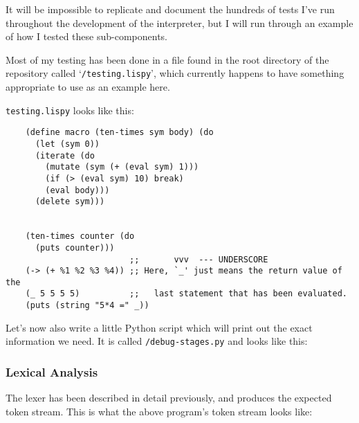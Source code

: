 \documentclass{article}
\newcommand{\code}[1]{\texttt{#1}}
\begin{document}
    It will be impossible to replicate and document the hundreds of tests
    I've run throughout the development of the interpreter, but I will run through
    an example of how I tested these sub-components.

    Most of my testing has been done in a file found in the root directory of
    the repository called `\code{/testing.lispy}', which currently happens
    to have something appropriate to use as an example here.

    \code{testing.lispy} looks like this:

    \begin{verbatim}
    (define macro (ten-times sym body) (do
      (let (sym 0))
      (iterate (do
        (mutate (sym (+ (eval sym) 1)))
        (if (> (eval sym) 10) break)
        (eval body)))
      (delete sym)))


    (ten-times counter (do
      (puts counter)))
                         ;;       vvv  --- UNDERSCORE
    (-> (+ %1 %2 %3 %4)) ;; Here, `_' just means the return value of the
    (_ 5 5 5 5)          ;;   last statement that has been evaluated.
    (puts (string "5*4 =" _))
    \end{verbatim}


    Let's now also write a little Python script which will print
    out the exact information we need. It is called \code{/debug-stages.py}
    and looks like this:



    \subsubsection{Lexical Analysis}
      The lexer has been described in detail previously, and produces the
      expected token stream. This is what the above program's token
      stream looks like:
\end{document}
